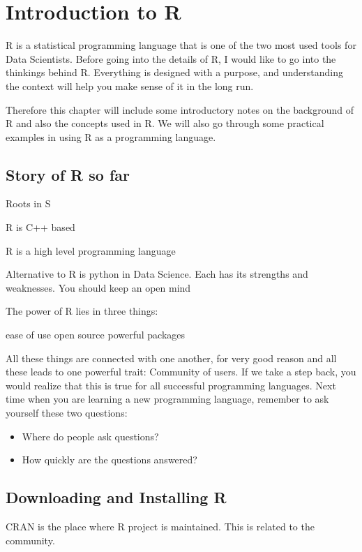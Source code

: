 \section{Introduction to R}


R is a statistical programming language that is one of the two most used tools for Data Scientists.  Before going into the details of R, I would like to go into the thinkings behind R.  Everything is designed with a purpose, and understanding the context will help you make sense of it in the long run.  

Therefore this chapter will include some introductory notes on the background of R and also the concepts used in R.  We will also go through some practical examples in using R as a programming language.  

\subsection{Story of R so far}

Roots in S 

R is C++ based 

R is a high level programming language 

Alternative to R is python in Data Science.  Each has its strengths and weaknesses.  You should keep an open mind 

The power of R lies in three things:

ease of use 
open source 
powerful packages


All these things are connected with one another, for very good reason and all these leads to one powerful trait: Community of users.  If we take a step back, you would realize that this is true for all successful programming languages.  Next time when you are learning a new programming language, remember to ask yourself these two questions:

\begin{itemize}
\item Where do people ask questions?
\item How quickly are the questions answered?
\end{itemize}

\subsection{Downloading and Installing R}

CRAN is the place where R project is maintained.  This is related to the community.  

